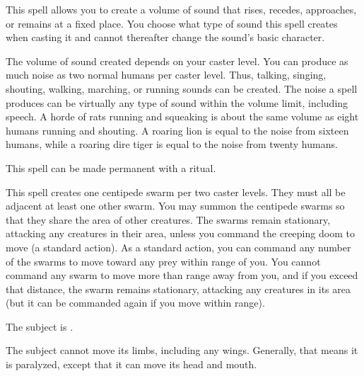 \spellrng{\rngclose}
\begin{spelleffect}
  This spell allows you to create a volume of sound that rises, recedes, approaches, or remains at a fixed place. You choose what type of sound this spell creates when casting it and cannot thereafter change the sound's basic character.
  \par The volume of sound created depends on your caster level. You can produce as much noise as two normal humans per caster level. Thus, talking, singing, shouting, walking, marching, or running sounds can be created. The noise a  spell produces can be virtually any type of sound within the volume limit, including speech. A horde of rats running and squeaking is about the same volume as eight humans running and shouting. A roaring lion is equal to the noise from sixteen humans, while a roaring dire tiger is equal to the noise from twenty humans.
\end{spelleffect}
\begin{spellnotes}
This spell can be made permanent with a  ritual.
\end{spellnotes}

\spelldur{\durmed}
\begin{spelleffect}
  This spell creates one centipede swarm per two caster levels. They must all be adjacent at least one other swarm. You may summon the centipede swarms so that they share the area of other creatures. The swarms remain stationary, attacking any creatures in their area, unless you command the creeping doom to move (a standard action). As a standard action, you can command any number of the swarms to move toward any prey within \rngmed range of you. You cannot command any swarm to move more than \rngmed range away from you, and if you exceed that distance, the swarm remains stationary, attacking any creatures in its area (but it can be commanded again if you move within range).
\end{spelleffect}

\spellrng{\rngmed}
\spelldur{\durshort}
\begin{spellhealthy}
  The subject is \staggered.
\end{spellhealthy}
\begin{spellblood}
  The subject cannot move its limbs, including any wings. Generally, that means it is paralyzed, except that it can move its head and mouth.
\end{spellblood}

